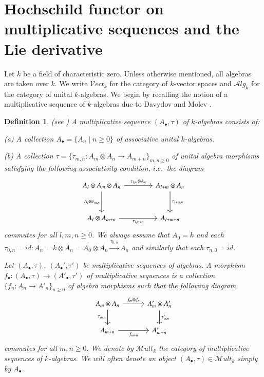 \documentclass[10pt, colorlinks]{article}
\numberwithin{equation}{section} \DeclareMathSizes{2}{10}{12}{13}
\newtheorem{defn}[thm]{Definition}
\begin{document}
     \section{Hochschild functor on multiplicative sequences  and the Lie derivative}
   Let $k$ be a field of characteristic zero. Unless otherwise mentioned, all algebras are taken over $k$. We write $\mathcal Vect_k$ for the category of $k$-vector spaces and $\mathcal Alg_k$ for the category of unital $k$-algebras. We begin by recalling the notion of a multiplicative sequence of $k$-algebras due to Davydov and Molev \cite{DAV}.  
   
\begin{defn}\label{def2.1}(see \cite[\S 2]{DAV})
A multiplicative sequence $({A}_\bullet,\tau)$ of $k$-algebras consists of:

\smallskip
(a) 
    A collection ${A}_\bullet=\{A_n \mid n \ge 0\}$ of associative unital $k$-algebras.

\smallskip
    (b)  A collection 
    $
        \tau=\{\tau_{m,n}: A_m \otimes A_n \longrightarrow A_{m+n}\}_{m,n\geq 0}
    $
    of unital algebra morphisms satisfying the following associativity condition, $i.e,$ the diagram 
\begin{equation}\label{diag1}
\begin{tikzcd}[column sep=4em, row sep=3em]
A_l \otimes A_m \otimes A_n
\arrow[r, "\tau_{l,m} \otimes A_n"]
\arrow[d, "A_l \otimes \tau_{m,n}"']
& A_{l+m} \otimes A_n \arrow[d, "\tau_{l+m,n}"] \\
A_l \otimes A_{m+n}
\arrow[r, "\tau_{l,m+n}"']
& A_{l+m+n}
\end{tikzcd}
\end{equation}
commutes for all $l,m,n \ge 0$. We always assume that $A_0=k$ and each $\tau_{0,n}=id:A_n=k\otimes A_n=A_0\otimes A_n\xrightarrow{\tau_{0,n}}A_n$ and similarly that each $\tau_{n,0}=id$. 


Let $({A}_\bullet,\tau)$, $({A}_\bullet',\tau')$ be multiplicative sequences of algebras. A morphism $f_\bullet:(A_\bullet,\tau)\longrightarrow (A'_\bullet,\tau')$ of multiplicative sequences is a collection $\{f_n:A_n\longrightarrow A'_n\}_{n\geq 0}$  of algebra morphisms such that the following diagram 
\begin{equation}\label{diag2}
\begin{tikzcd}[column sep=3em, row sep=2em]
A_m \otimes A_n
  \arrow[r, "f_m \otimes f_{n}"]
  \arrow[d, "\tau_{m,n}"']
&
A'_{m} \otimes A'_n
  \arrow[d, "\tau_{m,n}'"]
\\
A_{m+n}
  \arrow[r, "f_{m+n}"']
&
A'_{m+n}
\end{tikzcd}
    \end{equation}
commutes for all $m,n\geq 0.$ We denote by $\mathscr{M}ult_k$ the category of multiplicative sequences of $k$-algebras.  We will often denote an 
object $({A}_\bullet,\tau)\in \mathscr{M}ult_k$ simply by ${A}_\bullet$. 
\end{defn}
 
\end{document}
